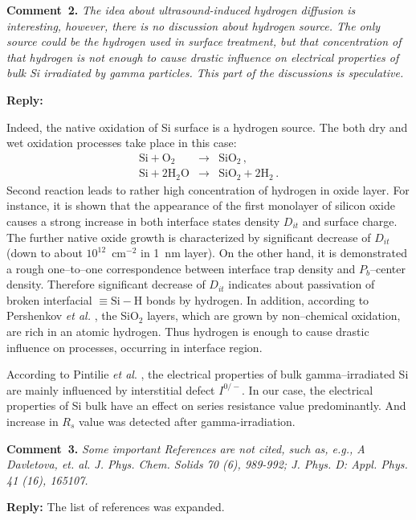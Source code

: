 \documentclass[aip,jap,preprint]{revtex4-1}
\begin{document}
\noindent
\textcolor[rgb]{0.00,0.50,1.00}{\textbf{Comment~2.}}
\emph{ The idea about ultrasound-induced hydrogen diffusion is interesting, however, there is no discussion about hydrogen source. The only source could be the hydrogen used in surface treatment, but that concentration of that hydrogen is not enough to cause drastic influence on electrical properties of bulk Si irradiated by gamma particles. This part of the discussions is speculative.}

\noindent
\textcolor[rgb]{0.51,0.00,0.00}{\textbf{Reply:}}

Indeed, the native oxidation of Si surface is a hydrogen source.
The both dry and wet oxidation processes take place in this case:
\begin{eqnarray}
\text{Si} + \text{O}_2&\rightarrow&\text{SiO}_2\,, \nonumber \\
\text{Si} + 2\text{H}_2\text{O}&\rightarrow&\text{SiO}_2+2\text{H}_2\,.\nonumber
\end{eqnarray}
Second reaction leads to rather high concentration of hydrogen in oxide layer.
For instance, it is shown \cite{angermann2016} that the appearance of the first monolayer of
silicon oxide causes a strong increase in both interface states density $D_{it}$ and surface charge.
The further native oxide growth is characterized by significant decrease of $D_{it}$ (down to about $10^{12}$~cm$^{-2}$ in 1~nm layer).
On the other hand, it is demonstrated \cite{Fleetwood} a rough one--to--one correspondence between interface trap density and $P_b$--center density.
Therefore significant decrease of $D_{it}$ indicates about passivation of broken interfacial $\equiv\!\mathrm{Si}\!-\!\mathrm{H}$ bonds by hydrogen.
In addition, according to Pershenkov \emph{et al.} \cite{PersenkovBook},  the SiO$_2$ layers, which are grown by non--chemical oxidation, are rich in an atomic hydrogen.
Thus hydrogen is enough to cause drastic influence on processes, occurring in interface region.

According to Pintilie \emph{et al}. \cite{FZSi:Rad}, the electrical properties of bulk gamma--irradiated Si are mainly influenced by interstitial defect $I^{0/-}$.
In our case, the electrical properties of Si bulk have an effect on series resistance value predominantly.
And increase in $R_s$ value was detected after gamma-irradiation.






\noindent
\textcolor[rgb]{0.00,0.50,1.00}{\textbf{Comment~3.}}
\emph{ Some important References are not cited, such as, e.g., A Davletova, et. al. J. Phys. Chem. Solids 70 (6), 989-992; J. Phys. D: Appl. Phys. 41 (16), 165107.}

\noindent
\textcolor[rgb]{0.51,0.00,0.00}{\textbf{Reply:}}
The list of references was expanded.



\end{document}
